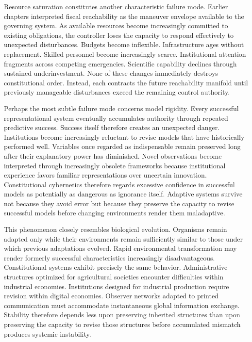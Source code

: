 \documentclass[12pt,a4paper]{article}
\begin{document}
Resource saturation constitutes another characteristic failure mode. Earlier chapters interpreted fiscal reachability as the maneuver envelope available to the governing system. As available resources become increasingly committed to existing obligations, the controller loses the capacity to respond effectively to unexpected disturbances. Budgets become inflexible. Infrastructure ages without replacement. Skilled personnel become increasingly scarce. Institutional attention fragments across competing emergencies. Scientific capability declines through sustained underinvestment. None of these changes immediately destroys constitutional order. Instead, each contracts the future reachability manifold until previously manageable disturbances exceed the remaining control authority.

Perhaps the most subtle failure mode concerns model rigidity. Every successful representational system eventually accumulates authority through repeated predictive success. Success itself therefore creates an unexpected danger. Institutions become increasingly reluctant to revise models that have historically performed well. Variables once regarded as indispensable remain preserved long after their explanatory power has diminished. Novel observations become interpreted through increasingly obsolete frameworks because institutional experience favors familiar representations over uncertain innovation. Constitutional cybernetics therefore regards excessive confidence in successful models as potentially as dangerous as ignorance itself. Adaptive systems survive not because they avoid error but because they preserve the capacity to revise successful models before changing environments render them maladaptive.

This phenomenon closely resembles biological evolution. Organisms remain adapted only while their environments remain sufficiently similar to those under which previous adaptations evolved. Rapid environmental transformation may render formerly successful characteristics increasingly disadvantageous. Constitutional systems exhibit precisely the same behavior. Administrative structures optimized for agricultural societies encounter difficulties within industrial economies. Institutions designed for industrial production require revision within digital economies. Observer networks adapted to printed communication must accommodate instantaneous global information exchange. Stability therefore depends less upon preserving inherited structures than upon preserving the capacity to revise those structures before accumulated mismatch produces systemic instability.
\end{document}
